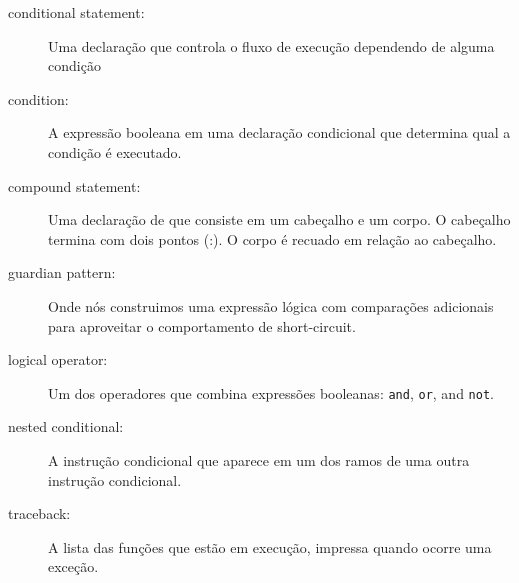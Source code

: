 {\begin{description}
\item[conditional statement:] Uma declaração que controla o fluxo de 
execução dependendo de alguma condição

\item[condition:] A expressão booleana em uma declaração condicional 
que determina qual a condição é executado.

\item[compound statement:]  Uma declaração de que consiste em um cabeçalho 
e um corpo. O cabeçalho termina com dois pontos (:). O corpo é recuado em 
relação ao cabeçalho.

\item[guardian pattern:] 
Onde nós construimos uma expressão lógica com 
comparações adicionais para 
aproveitar o comportamento de short-circuit.

\item[logical operator:] Um dos operadores que combina expressões 
booleanas: {\tt and}, {\tt or}, and {\tt not}.

\item[nested conditional:]  A instrução condicional que aparece em um dos 
ramos de uma outra instrução condicional.

\item[traceback:]  A lista das funções que estão em execução, 
impressa quando ocorre uma exceção.


\end{description}}
